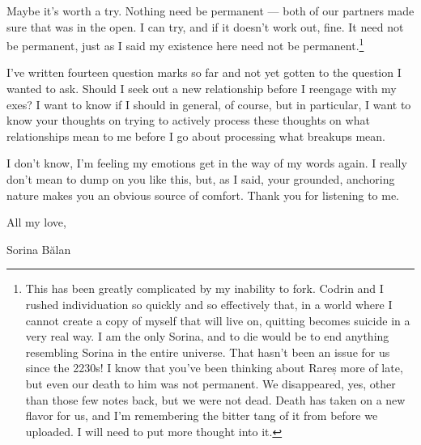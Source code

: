 Maybe it's worth a try. Nothing need be permanent — both of our partners made sure that was in the open. I can try, and if it doesn't work out, fine. It need not be permanent, just as I said my existence here need not be permanent.\footnote{This has been greatly complicated by my inability to fork. Codrin and I rushed individuation so quickly and so effectively that, in a world where I cannot create a copy of myself that will live on, quitting becomes suicide in a very real way. I am the only Sorina, and to die would be to end anything resembling Sorina in the entire universe. That hasn't been an issue for us since the 2230s! I know that you've been thinking about Rareș more of late, but even our death to him was not permanent. We disappeared, yes, other than those few notes back, but we were not dead. Death has taken on a new flavor for us, and I'm remembering the bitter tang of it from before we uploaded. I will need to put more thought into it.}

I've written fourteen question marks so far and not yet gotten to the question I wanted to ask. Should I seek out a new relationship before I reengage with my exes? I want to know if I should in general, of course, but in particular, I want to know your thoughts on trying to actively process these thoughts on what relationships mean to me before I go about processing what breakups mean.

I don't know, I'm feeling my emotions get in the way of my words again. I really don't mean to dump on you like this, but, as I said, your grounded, anchoring nature makes you an obvious source of comfort. Thank you for listening to me.

All my love,

Sorina Bălan
